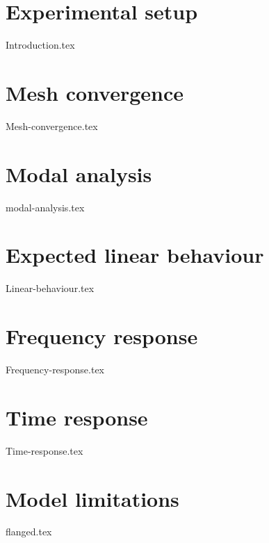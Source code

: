 \section{Experimental setup}
    {Introduction.tex}
\section{Mesh convergence}
    {Mesh-convergence.tex}
\section{Modal analysis}
    {modal-analysis.tex}
\section{Expected linear behaviour}
    {Linear-behaviour.tex}
\section{Frequency response}
    {Frequency-response.tex}
\section{Time response}
    {Time-response.tex}
\section{Model limitations}
    {flanged.tex}